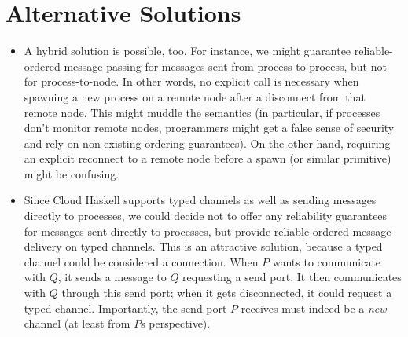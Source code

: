 \documentclass[10pt]{article}
\begin{document}
\section*{Alternative Solutions}

\begin{itemize}

\item A hybrid solution is possible, too. For instance, we might guarantee
reliable-ordered message passing for messages sent from process-to-process, but
not for process-to-node. In other words, no explicit call is necessary when
spawning a new process on a remote node after a disconnect from that remote
node. This might muddle the semantics (in particular, if processes don't
monitor remote nodes, programmers might get a false sense of security and rely
on non-existing ordering guarantees). On the other hand, requiring an explicit
reconnect to a remote node before a spawn (or similar primitive) might be
confusing. 

\item Since Cloud Haskell supports typed channels as well as sending messages
directly to processes, we could decide not to offer any reliability guarantees
for messages sent directly to processes, but provide reliable-ordered message
delivery on typed channels. This is an attractive solution, because a typed
channel could be considered a connection. When $P$ wants to communicate with
$Q$, it sends a message to $Q$ requesting a send port. It then communicates
with $Q$ through this send port; when it gets disconnected, it could request a
 typed channel. Importantly, the send port $P$ receives must indeed
be a \emph{new} channel (at least from $P$s perspective). 

\end{itemize}
\end{document}
